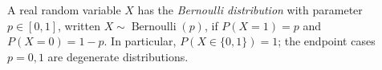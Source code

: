 
A real random variable $X$ has the \emph{Bernoulli distribution} with parameter $p\in[0,1]$, written $X\sim\operatorname{Bernoulli}(p)$, if $P(X=1)=p$ and $P(X=0)=1-p$. In particular, $P(X\in\{0,1\})=1$; the endpoint cases $p=0,1$ are degenerate distributions.
